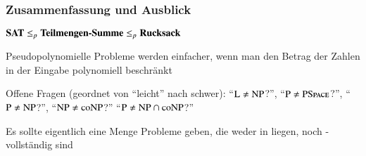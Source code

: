 \documentclass[aspectratio=1610,onlymath]{beamer}
\begin{document}
\begin{frame}\frametitle{Zusammenfassung und Ausblick}

$\textbf{\textcolor{black}{SAT}}\leq_p\textbf{\textcolor{black}{Teilmengen-Summe}}\leq_p \textbf{\textcolor{black}{Rucksack}}$
\bigskip

Pseudopolynomielle Probleme werden einfacher, wenn man den Betrag der Zahlen in der Eingabe polynomiell beschränkt\bigskip

Offene Fragen (geordnet von "`leicht"' nach schwer):
"`${\textsc{L}}\neq{\textsc{NP}}$?"',
"`${\textsc{P}}\neq{\textsc{PSpace}}$?"',
"`${\textsc{P}}\neq{\textsc{NP}}$?"',
"`${\textsc{NP}}\neq{\textsc{coNP}}$?"'
"`${\textsc{P}}\neq {\textsc{NP}}\cap{\textsc{coNP}}$?"'
\bigskip

Es sollte eigentlich eine Menge Probleme geben, die weder in  liegen, noch -vollständig sind\bigskip


\end{frame}



% 
% 
% 
% 
% 
% 
\end{document}
